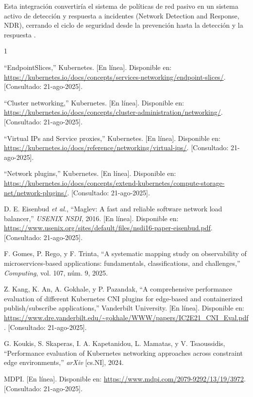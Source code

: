 \documentclass[journal]{IEEEtran}
\begin{document}
Esta integración convertiría el sistema de políticas de red pasivo en un sistema activo de detección y respuesta a incidentes (Network Detection and Response, NDR), cerrando el ciclo de seguridad desde la prevención hasta la detección y la respuesta \cite{ref27}.

\begin{thebibliography}{1}

``EndpointSlices,'' Kubernetes. [En línea]. Disponible en: \url{https://kubernetes.io/docs/concepts/services-networking/endpoint-slices/}. [Consultado: 21-ago-2025].

``Cluster networking,'' Kubernetes. [En línea]. Disponible en: \url{https://kubernetes.io/docs/concepts/cluster-administration/networking/}. [Consultado: 21-ago-2025].

``Virtual IPs and Service proxies,'' Kubernetes. [En línea]. Disponible en: \url{https://kubernetes.io/docs/reference/networking/virtual-ips/}. [Consultado: 21-ago-2025].

``Network plugins,'' Kubernetes. [En línea]. Disponible en: \url{https://kubernetes.io/docs/concepts/extend-kubernetes/compute-storage-net/network-plugins/}. [Consultado: 21-ago-2025].

D. E. Eisenbud \emph{et al.}, ``Maglev: A fast and reliable software network load balancer,'' \emph{USENIX NSDI}, 2016. [En línea]. Disponible en: \url{https://www.usenix.org/sites/default/files/nsdi16-paper-eisenbud.pdf}. [Consultado: 21-ago-2025].

F. Gomes, P. Rego, y F. Trinta, ``A systematic mapping study on observability of microservices-based applications: fundamentals, classifications, and challenges,'' \emph{Computing}, vol. 107, núm. 9, 2025.

Z. Kang, K. An, A. Gokhale, y P. Pazandak, ``A comprehensive performance evaluation of different Kubernetes CNI plugins for edge-based and containerized publish/subscribe applications,'' Vanderbilt University. [En línea]. Disponible en: \url{https://www.dre.vanderbilt.edu/~gokhale/WWW/papers/IC2E21_CNI_Eval.pdf}. [Consultado: 21-ago-2025].

G. Koukis, S. Skaperas, I. A. Kapetanidou, L. Mamatas, y V. Tsaoussidis, ``Performance evaluation of Kubernetes networking approaches across constraint edge environments,'' \emph{arXiv} [cs.NI], 2024.

MDPI. [En línea]. Disponible en: \url{https://www.mdpi.com/2079-9292/13/19/3972}. [Consultado: 21-ago-2025].


\end{thebibliography}
\end{document}
